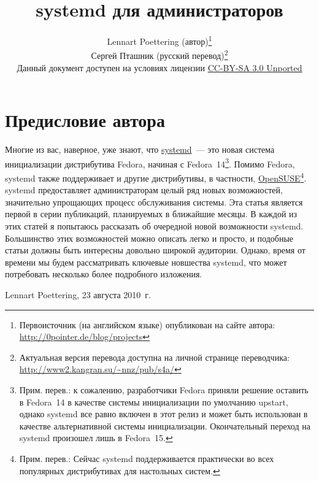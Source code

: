 \documentclass[10pt,oneside,a4paper]{article}
\newcommand{\sectiona}[1]{\section*{#1}\addcontentsline{toc}{section}{#1}}
\begin{document}
\sloppy
\title{systemd для администраторов}
\author{Lennart Poettering (автор)\thanks{Первоисточник (на английском
языке) опубликован на сайте автора: \url{http://0pointer.de/blog/projects}}\\%
Сергей Пташник (русский перевод)\thanks{Актуальная версия перевода
доступна на личной странице переводчика:
\url{http://www2.kangran.su/~nnz/pub/s4a/}}\\%
\small Данный документ доступен на условиях лицензии
\href{http://creativecommons.org/licenses/by-sa/3.0/legalcode}{CC-BY-SA 3.0
Unported}}
\maketitle
\tableofcontents%
\sectiona{Предисловие автора}
Многие из вас, наверное, уже знают, что
\href{http://www.freedesktop.org/wiki/Software/systemd}{systemd}~--- это новая
система инициализации дистрибутива Fedora, начиная с Fedora~14\footnote{Прим.
перев.: к сожалению, разработчики Fedora приняли решение оставить в Fedora~14 в
качестве системы инициализации по умолчанию upstart, однако systemd все равно
включен в этот релиз и может быть использован в качестве альтернативной системы
инициализации. Окончательный переход на systemd произошел лишь в Fedora~15.}.
Помимо Fedora, systemd также поддерживает и другие дистрибутивы, в частности,
\href{http://en.opensuse.org/SDB:Systemd}{OpenSUSE}\footnote{Прим. перев.:
Сейчас systemd поддерживается практически во всех популярных дистрибутивах для
настольных систем.}.  systemd предоставляет администраторам целый ряд новых
возможностей, значительно упрощающих процесс обслуживания системы. Эта статья
является первой в серии публикаций, планируемых в ближайшие месяцы. В каждой из
этих статей я попытаюсь рассказать об очередной новой возможности systemd.
Большинство этих возможностей можно описать легко и просто, и подобные статьи
должны быть интересны довольно широкой аудитории.  Однако, время от времени мы
будем рассматривать ключевые новшества systemd, что может потребовать несколько
более подробного изложения. 
\begin{flushright}
	Lennart Poettering, 23 августа 2010~г.
\end{flushright}
\end{document}

